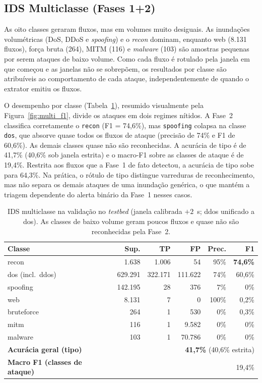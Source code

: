 \documentclass[12pt]{article}
\begin{document}
\subsection{IDS Multiclasse (Fases 1+2)}
\label{subsec:res_multi}

As oito classes geraram fluxos, mas em volumes muito desiguais. As inundações
volumétricas (DoS, DDoS e \textit{spoofing}) e o \textit{recon} dominam, enquanto
web (8.131 fluxos), força bruta (264), MITM (116) e \textit{malware} (103) são
amostras pequenas por serem ataques de baixo volume. Como cada fluxo é rotulado
pela janela em que começou e as janelas não se sobrepõem, os resultados por
classe são atribuíveis ao comportamento de cada ataque, independentemente de
quando o extrator emitiu os fluxos.

O desempenho por classe (Tabela~\ref{tab:multi_metrics}), resumido visualmente
pela Figura~\ref{fig:multi_f1}, divide os ataques em dois regimes nítidos. A
Fase~2 classifica corretamente o \texttt{recon} (F1 = 74,6\%), mas
\texttt{spoofing} colapsa na classe \texttt{dos}, que absorve quase todos os
fluxos de ataque (precisão de 74\% e F1 de 60,6\%). As demais classes quase não
são reconhecidas. A acurácia de tipo é de 41,7\% (40,6\% sob janela estrita) e o
macro-F1 sobre as classes de ataque é de 19,4\%. Restrita aos fluxos que a Fase~1
de fato detectou, a acurácia de tipo sobe para 64,3\%. Na prática, o rótulo de
tipo distingue varreduras de reconhecimento, mas não separa os demais ataques de
uma inundação genérica, o que mantém a triagem dependente do alerta binário da
Fase~1 nesses casos.


\begin{table}[ht]
\centering
\caption{IDS multiclasse na validação no \textit{testbed} (janela calibrada
$+2$~s; ddos unificado a dos). As classes de baixo volume geram poucos fluxos e
quase não são reconhecidas pela Fase~2.}
\label{tab:multi_metrics}
\begin{tabular}{@{}lrrrrr@{}}
\toprule
\textbf{Classe} & \textbf{Sup.} & \textbf{TP} & \textbf{FP} & \textbf{Prec.} & \textbf{F1} \\ \midrule
recon             &   1.638 &   1.006 &      54 & 95\% & \textbf{74,6\%} \\
dos (incl.\ ddos) & 629.291 & 322.171 & 111.622 & 74\% & 60,6\% \\
spoofing          & 142.195 &      28 &     376 & 7\%  & 0\% \\
web               &   8.131 &       7 &       0 & 100\% & 0,2\% \\
bruteforce        &     264 &       1 &     530 & 0\%  & 0,3\% \\
mitm              &     116 &       1 &   9.582 & 0\%  & 0\% \\
malware           &     103 &       1 &  70.786 & 0\%  & 0\% \\ \midrule
\textbf{Acurácia geral (tipo)} & \multicolumn{5}{r}{\textbf{41,7\%} (40,6\% estrita)} \\
\textbf{Macro F1 (classes de ataque)} & \multicolumn{5}{r}{19,4\%} \\
\bottomrule
\end{tabular}
\end{table}
\end{document}
